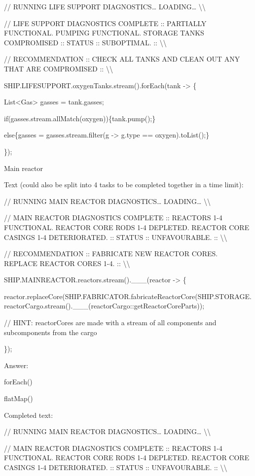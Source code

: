 \documentclass[
]{article}
\begin{document}
// RUNNING LIFE SUPPORT DIAGNOSTICS\ldots{} LOADING\ldots{}
\textbackslash\textbackslash{}

// LIFE SUPPORT DIAGNOSTICS COMPLETE :: PARTIALLY FUNCTIONAL. PUMPING
FUNCTIONAL. STORAGE TANKS COMPROMISED :: STATUS :: SUBOPTIMAL. ::
\textbackslash\textbackslash{}

// RECOMMENDATION :: CHECK ALL TANKS AND CLEAN OUT ANY THAT ARE
COMPROMISED :: \textbackslash\textbackslash{}

SHIP.LIFESUPPORT.oxygenTanks.stream().forEach(tank -\textgreater{} \{

List\textless Gas\textgreater{} gasses = tank.gasses;

if(gasses.stream.allMatch(oxygen))\{tank.pump();\}

else\{gasses = gasses.stream.filter(g -\textgreater{} g.type ==
oxygen).toList();\}

\});

Main reactor

Text (could also be split into 4 tasks to be completed together in a
time limit):

// RUNNING MAIN REACTOR DIAGNOSTICS\ldots{} LOADING\ldots{}
\textbackslash\textbackslash{}

// MAIN REACTOR DIAGNOSTICS COMPLETE :: REACTORS 1-4 FUNCTIONAL. REACTOR
CORE RODS 1-4 DEPLETED. REACTOR CORE CASINGS 1-4 DETERIORATED. :: STATUS
:: UNFAVOURABLE. :: \textbackslash\textbackslash{}

// RECOMMENDATION :: FABRICATE NEW REACTOR CORES. REPLACE REACTOR CORES
1-4. :: \textbackslash\textbackslash{}

SHIP.MAINREACTOR.reactors.stream().\_\_\_(reactor -\textgreater{} \{

reactor.replaceCore(SHIP.FABRICATOR.fabricateReactorCore(SHIP.STORAGE.reactorCargo.stream().\_\_\_(reactorCargo::getReactorCoreParts));

// HINT: reactorCores are made with a stream of all components and
subcomponents from the cargo

\});

Answer:

forEach()

flatMap()

Completed text:

// RUNNING MAIN REACTOR DIAGNOSTICS\ldots{} LOADING\ldots{}
\textbackslash\textbackslash{}

// MAIN REACTOR DIAGNOSTICS COMPLETE :: REACTORS 1-4 FUNCTIONAL. REACTOR
CORE RODS 1-4 DEPLETED. REACTOR CORE CASINGS 1-4 DETERIORATED. :: STATUS
:: UNFAVOURABLE. :: \textbackslash\textbackslash{}
\end{document}
